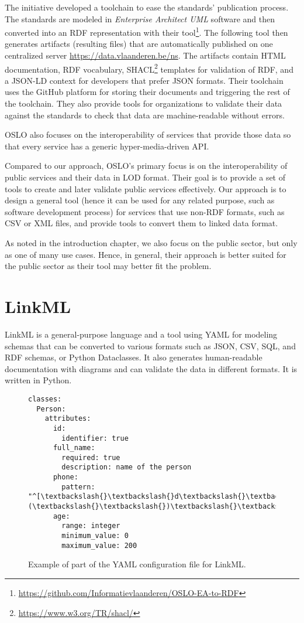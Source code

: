 The initiative developed a toolchain to ease the standards' publication process. The standards are modeled in \textit{Enterprise Architect UML} software and then converted into an RDF representation with their tool\footnote{\url{https://github.com/Informatievlaanderen/OSLO-EA-to-RDF}}. The following tool then generates artifacts (resulting files) that are automatically published on one centralized server \url{https://data.vlaanderen.be/ns}. The artifacts contain HTML documentation, RDF vocabulary, SHACL\footnote{\url{https://www.w3.org/TR/shacl/}} templates for validation of RDF, and a JSON-LD context for developers that prefer JSON formats. Their toolchain uses the GitHub platform for storing their documents and triggering the rest of the toolchain. They also provide tools for organizations to validate their data against the standards to check that data are machine-readable without errors.

OSLO also focuses on the interoperability of services that provide those data so that every service has a generic hyper-media-driven API.

\medskip

Compared to our approach, OSLO's primary focus is on the interoperability of public services and their data in LOD format. Their goal is to provide a set of tools to create and later validate public services effectively. Our approach is to design a general tool (hence it can be used for any related purpose, such as software development process) for services that use non-RDF formats, such as CSV or XML files, and provide tools to convert them to linked data format.

As noted in the introduction chapter, we also focus on the public sector, but only as one of many use cases. Hence, in general, their approach is better suited for the public sector as their tool may better fit the problem.

\section{LinkML}

LinkML is a general-purpose language and a tool using YAML for modeling schemas that can be converted to various formats such as JSON, CSV, SQL, and RDF schemas, or Python Dataclasses. It also generates human-readable documentation with diagrams and can validate the data in different formats. It is written in Python.

\begin{figure}[h!]\centering
    \begin{Verbatim}[commandchars=\\\{\}]
classes:
  Person:
    attributes:
      id:
        identifier: true
      full_name:
        required: true
        description: name of the person
      phone:
        pattern: "^[\textbackslash{}\textbackslash{}d\textbackslash{}\textbackslash{}(\textbackslash{}\textbackslash{})\textbackslash{}\textbackslash{}-]+$"
      age:
        range: integer
        minimum_value: 0
        maximum_value: 200
    \end{Verbatim}
    \caption{Example of part of the YAML configuration file for LinkML.}
\end{figure}

